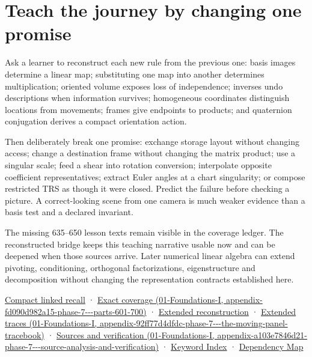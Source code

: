 \section{Teach the journey by changing one promise}\label{02-foundations-ii-ch038-teach-the-journey-by-changing-one-promise}

Ask a learner to reconstruct each new rule from the previous one: basis images determine a linear map; substituting one map into another determines multiplication; oriented volume exposes loss of independence; inverses undo descriptions when information survives; homogeneous coordinates distinguish locations from movements; frames give endpoints to products; and quaternion conjugation derives a compact orientation action.

Then deliberately break one promise: exchange storage layout without changing access; change a destination frame without changing the matrix product; use a singular scale; feed a shear into rotation conversion; interpolate opposite coefficient representatives; extract Euler angles at a chart singularity; or compose restricted TRS as though it were closed. Predict the failure before checking a picture. A correct-looking scene from one camera is much weaker evidence than a basis test and a declared invariant.

The missing 635--650 lesson texts remain visible in the coverage ledger. The reconstructed bridge keeps this teaching narrative usable now and can be deepened when those sources arrive. Later numerical linear algebra can extend pivoting, conditioning, orthogonal factorizations, eigenstructure and decomposition without changing the representation contracts established here.

\hyperref[appendix-68f22c734be3]{Compact linked recall} · \href{../01-Foundations-I/main.pdf\#nameddest=appendix-fd090d982a15-phase-7---parts-601-700}{Exact coverage (01-Foundations-I, appendix-fd090d982a15-phase-7-\/-\/-parts-601-700)} · \hyperref[02-foundations-ii-ch039-phase-7---transform-reconstruction-proofs]{Extended reconstruction} · \href{../01-Foundations-I/main.pdf\#nameddest=appendix-92ff77d4dfdc-phase-7---the-moving-panel-tracebook}{Extended traces (01-Foundations-I, appendix-92ff77d4dfdc-phase-7-\/-\/-the-moving-panel-tracebook)} · \href{../01-Foundations-I/main.pdf\#nameddest=appendix-a103e7846d21-phase-7---source-analysis-and-verification}{Sources and verification (01-Foundations-I, appendix-a103e7846d21-phase-7-\/-\/-source-analysis-and-verification)} · \hyperref[appendix-a6d556a4ef50]{Keyword Index} · \hyperref[appendix-4ad47bdd269a]{Dependency Map}

